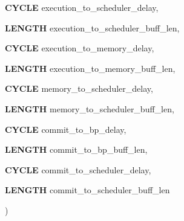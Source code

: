 {{\begin{DoxyParamCaption}
\item[{{\bf CYCLE}}]{execution\_\-to\_\-scheduler\_\-delay, }
\item[{{\bf LENGTH}}]{execution\_\-to\_\-scheduler\_\-buff\_\-len, }
\item[{{\bf CYCLE}}]{execution\_\-to\_\-memory\_\-delay, }
\item[{{\bf LENGTH}}]{execution\_\-to\_\-memory\_\-buff\_\-len, }
\item[{{\bf CYCLE}}]{memory\_\-to\_\-scheduler\_\-delay, }
\item[{{\bf LENGTH}}]{memory\_\-to\_\-scheduler\_\-buff\_\-len, }
\item[{{\bf CYCLE}}]{commit\_\-to\_\-bp\_\-delay, }
\item[{{\bf LENGTH}}]{commit\_\-to\_\-bp\_\-buff\_\-len, }
\item[{{\bf CYCLE}}]{commit\_\-to\_\-scheduler\_\-delay, }
\item[{{\bf LENGTH}}]{commit\_\-to\_\-scheduler\_\-buff\_\-len}
\end{DoxyParamCaption}
)}}
\label{classsysCore_a1372d54e87258b1725df6c2b61aaa6fe}

